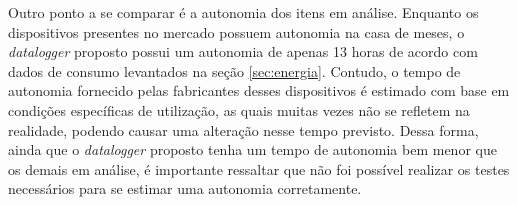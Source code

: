 Outro ponto a se comparar é a autonomia dos itens em análise. Enquanto os dispositivos presentes no mercado possuem autonomia na casa de meses, o \textit{datalogger} proposto possui um autonomia de apenas 13 horas de acordo com dados de consumo levantados na seção \ref{sec:energia}. Contudo, o tempo de autonomia fornecido pelas fabricantes desses dispositivos é estimado com base em condições específicas de utilização, as quais muitas vezes não se refletem na realidade, podendo causar uma alteração nesse tempo previsto. Dessa forma, ainda que o \textit{datalogger} proposto tenha um tempo de autonomia bem menor que os demais em análise, é importante ressaltar que não foi possível realizar os testes necessários para se estimar uma autonomia corretamente. 

\begin{table}[!h]
	
	\captionsetup{width=7cm}%
    \end{table}

